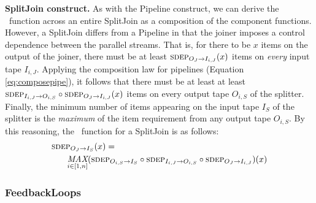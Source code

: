 {\bf SplitJoin construct.}  As with the Pipeline construct, we can
derive the \sdep~function across an entire SplitJoin as a composition
of the component functions.  However, a SplitJoin differs from a
Pipeline in that the joiner imposes a control dependence between the
parallel streams.  That is, for there to be $x$ items on the output of
the joiner, there must be at least $\mi{I_{i,J}}{O_J}(x)$ items on {\it
every} input tape $I_{i,J}$.  Applying the composition law for pipelines
(Equation \ref{eq:composepipe}), it follows that there must be at
least at least $\mi{O_{i,S}}{I_{i,J}} \circ \mi{I_{i,J}}{O_J}(x)$ items on
every output tape $O_{i,S}$ of the splitter.  Finally, the minimum number
of items appearing on the input tape $I_S$ of the splitter is the {\it
maximum} of the item requirement from any output tape $O_{i,S}$.  By this
reasoning, the \sdep~function for a SplitJoin is as follows:
\begin{align*}
&\mi{I_S}{O_J}(x) = \\ &~~~~~\fn{MAX}_{i \in [1,n]}(\mi{I_S}{O_{i,S}} \circ
\mi{O_{i,S}}{I_{i,J}} \circ \mi{I_{i,J}}{O_J})(x)
\end{align*}

\subsubsection{FeedbackLoops}
\label{sec:timefl}

